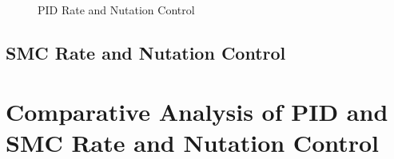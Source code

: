 \begin{figure}[H]
  \centerline{}
  \caption{PID Rate and Nutation Control}
  \label{fig:PIDNutationRateControl}
\end{figure}

\subsection{SMC Rate and Nutation Control}
\label{subsec:SMC}


\section{Comparative Analysis of PID and SMC Rate and Nutation Control}
\label{sec:ComparativeAnalysisofPIDandSMCRateandNutationControl}

